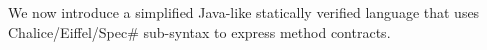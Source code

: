 
We now introduce a simplified Java-like statically verified language \svl that uses Chalice/Eiffel/Spec\# %
sub-syntax to express method contracts.


